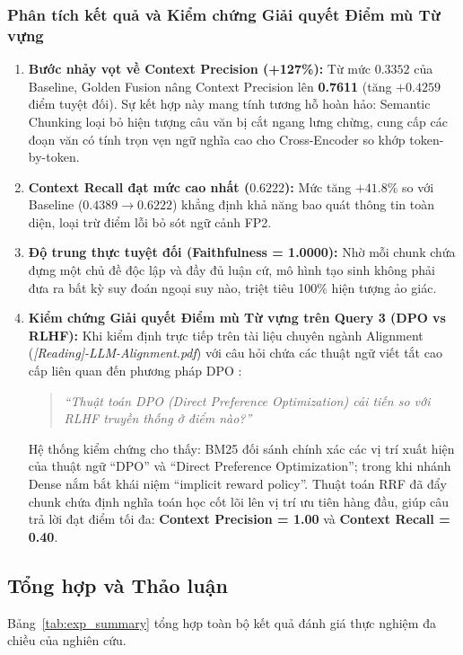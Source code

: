 ﻿\documentclass[12pt]{article}
\begin{document}
\subsubsection{Phân tích kết quả và Kiểm chứng Giải quyết Điểm mù Từ vựng}

\begin{enumerate}
    \item \textbf{Bước nhảy vọt về Context Precision (+127\%):} Từ mức $0.3352$ của Baseline, Golden Fusion nâng Context Precision lên \textbf{0.7611} (tăng $+0.4259$ điểm tuyệt đối). Sự kết hợp này mang tính tương hỗ hoàn hảo: Semantic Chunking loại bỏ hiện tượng câu văn bị cắt ngang lưng chừng, cung cấp các đoạn văn có tính trọn vẹn ngữ nghĩa cao cho Cross-Encoder so khớp token-by-token.
    \item \textbf{Context Recall đạt mức cao nhất ($0.6222$):} Mức tăng $+41.8\%$ so với Baseline ($0.4389 \to 0.6222$) khẳng định khả năng bao quát thông tin toàn diện, loại trừ điểm lỗi bỏ sót ngữ cảnh FP2.
    \item \textbf{Độ trung thực tuyệt đối (Faithfulness = 1.0000):} Nhờ mỗi chunk chứa đựng một chủ đề độc lập và đầy đủ luận cứ, mô hình tạo sinh không phải đưa ra bất kỳ suy đoán ngoại suy nào, triệt tiêu 100\% hiện tượng ảo giác.
    \item \textbf{Kiểm chứng Giải quyết Điểm mù Từ vựng trên Query 3 (DPO vs RLHF):} Khi kiểm định trực tiếp trên tài liệu chuyên ngành Alignment (\textit{[Reading]-LLM-Alignment.pdf}) với câu hỏi chứa các thuật ngữ viết tắt cao cấp liên quan đến phương pháp DPO \cite{rafailov2023direct}:
    \begin{quote}
        \textit{``Thuật toán DPO (Direct Preference Optimization) cải tiến so với RLHF truyền thống ở điểm nào?''}
    \end{quote}
    Hệ thống kiểm chứng cho thấy: BM25 đối sánh chính xác các vị trí xuất hiện của thuật ngữ ``DPO'' và ``Direct Preference Optimization''; trong khi nhánh Dense nắm bắt khái niệm ``implicit reward policy''. Thuật toán RRF đã đẩy chunk chứa định nghĩa toán học cốt lõi lên vị trí ưu tiên hàng đầu, giúp câu trả lời đạt điểm tối đa: \textbf{Context Precision = 1.00} và \textbf{Context Recall = 0.40}.
\end{enumerate}

\subsection{Tổng hợp và Thảo luận}

Bảng~\ref{tab:exp_summary} tổng hợp toàn bộ kết quả đánh giá thực nghiệm đa chiều của nghiên cứu.
\end{document}
